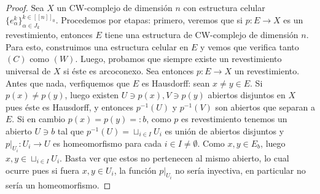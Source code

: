 \documentclass[11pt]{article}
\newcommand{\nat}[1]{[\![#1]\!]}
\newcommand{\natzero}[1]{\nat{#1}_0}
\begin{document}
\begin{proof} Sea $X$ un CW-complejo de dimensi\'on $n$ con estructura celular $\{e^{k}_\alpha\}_{\alpha \in J_k}^{k \in \natzero{n}}$. Procedemos por etapas: primero, veremos que si $p : E \to X$ es un revestimiento, entonces $E$ tiene una estructura de CW-complejo de dimensi\'on $n$. Para esto, construimos una estructura celular en $E$ y vemos que verifica tanto $(C)$ como $(W)$. Luego, probamos que siempre existe un revestimiento universal de $X$ si \'este es arcoconexo. Sea entonces $p : E \to X$ un revestimiento. Antes que nada, verfiquemos que $E$ es Hausdorff: sean $x \neq y \in E$. Si $p(x) \neq p(y)$, luego existen $U \ni p(x), V \ni p(y)$ abiertos disjuntos en $X$ pues \'este es Hausdorff, y entonces $p^{-1}(U)$ y $p^{-1}(V)$ son abiertos que separan a $E$. Si en cambio $p(x) = p(y) =: b$, como $p$ es revestimiento tenemos un abierto $U \ni b$ tal que $p^{-1}(U) = \sqcup_{i \in I} U_i$ es uni\'on de abiertos disjuntos y $p|_{U_i} : U_i \to U$ es homeomorfismo para cada $i \in I \neq \emptyset$. Como $x,y \in E_b$, luego $x,y \in \sqcup_{i \in I}U_i$. Basta ver que estos no pertenecen al mismo abierto, lo cual ocurre pues si fuera $x,y \in U_i$, la funci\'on $p|_{U_i}$ no ser\'ia inyectiva, en particular no ser\'ia un homeomorfismo. 



\end{proof}
\end{document}
